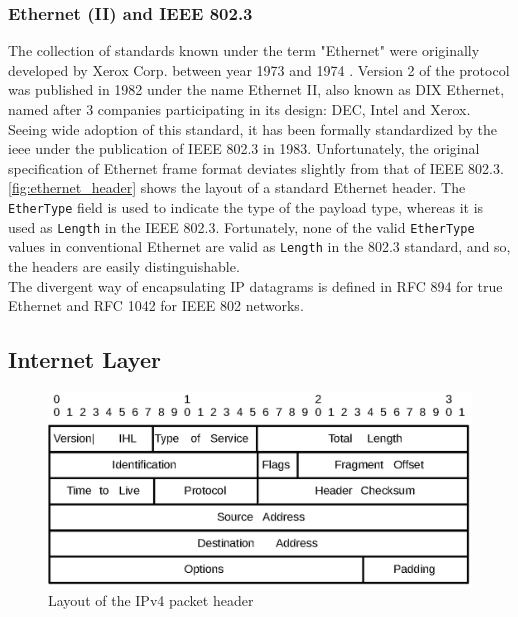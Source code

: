 \subsubsection{Ethernet (II) and IEEE 802.3}
The collection of standards known under the term "Ethernet" were originally
developed by Xerox Corp. between year 1973 and 1974\cite{americanhistory_ethernet}
\cite{tcpip_illustrated_vol1}. Version 2 of the protocol was published in 1982
under the name Ethernet II, also known as DIX Ethernet, named after 3 companies
participating in its design: DEC, Intel and Xerox\cite{heywood2001drew}.\\
Seeing wide adoption of this standard, it has been formally standardized by
the \gls{ieee} under the publication of IEEE 802.3 in
1983\cite{ieee_8023_release}. Unfortunately, the original specification of
Ethernet frame format deviates slightly from that of IEEE
802.3\cite{tcpip_illustrated_vol1}. \autoref{fig:ethernet_header} shows the
layout of a standard Ethernet header. The \texttt{EtherType} field is used to
indicate the type of the payload type, whereas it is used as \texttt{Length} in
the IEEE 802.3. Fortunately, none of the valid \texttt{EtherType} values in
conventional Ethernet are valid as \texttt{Length} in the 802.3 standard, and
so, the headers are easily distinguishable.
\\
The divergent way of encapsulating IP datagrams is defined in RFC 894 for
true Ethernet\cite{RFC0894} and RFC 1042 for IEEE 802 networks\cite{RFC1042}.



\subsection{Internet Layer}
\begin{figure}
\includegraphics[width=\linewidth]{background/ip.eps}
\caption{Layout of the IPv4 packet header}
\label{fig:ipv4_header}
\end{figure}

